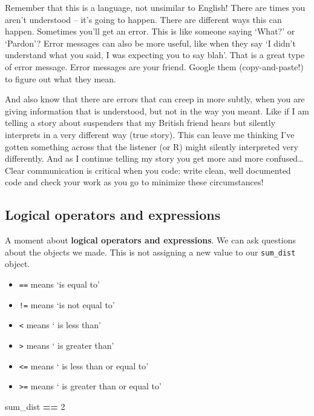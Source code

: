 \documentclass[]{book}
\newenvironment{Shaded}{\begin{snugshade}}{\end{snugshade}}
\newcommand{\DecValTok}[1]{\textcolor[rgb]{0.00,0.00,0.81}{#1}}
\newcommand{\NormalTok}[1]{#1}
\newcommand{\OperatorTok}[1]{\textcolor[rgb]{0.81,0.36,0.00}{\textbf{#1}}}
\newcommand{\StringTok}[1]{\textcolor[rgb]{0.31,0.60,0.02}{#1}}
\providecommand{\tightlist}{%
  \setlength{\itemsep}{0pt}\setlength{\parskip}{0pt}}
\begin{document}
Remember that this is a language, not unsimilar to English! There are times you aren't understood -- it's going to happen. There are different ways this can happen. Sometimes you'll get an error. This is like someone saying `What?' or `Pardon'? Error messages can also be more useful, like when they say `I didn't understand what you said, I was expecting you to say blah'. That is a great type of error message. Error messages are your friend. Google them (copy-and-paste!) to figure out what they mean.

And also know that there are errors that can creep in more subtly, when you are giving information that is understood, but not in the way you meant. Like if I am telling a story about suspenders that my British friend hears but silently interprets in a very different way (true story). This can leave me thinking I've gotten something across that the listener (or R) might silently interpreted very differently. And as I continue telling my story you get more and more confused\ldots{} Clear communication is critical when you code: write clean, well documented code and check your work as you go to minimize these circumstances!

\hypertarget{logical-operators-and-expressions}{%
\subsection{Logical operators and expressions}\label{logical-operators-and-expressions}}

A moment about \textbf{logical operators and expressions}. We can ask questions about the objects we made. This is not assigning a new value to our \texttt{sum\_dist} object.

\begin{itemize}
\tightlist
\item
  \texttt{==} means `is equal to'
\item
  \texttt{!=} means `is not equal to'
\item
  \texttt{\textless{}} means ` is less than'
\item
  \texttt{\textgreater{}} means ` is greater than'
\item
  \texttt{\textless{}=} means ` is less than or equal to'
\item
  \texttt{\textgreater{}=} means ` is greater than or equal to'
\end{itemize}

\begin{Shaded}
\begin{Highlighting}[]
\NormalTok{sum_dist }\OperatorTok{==}\StringTok{ }\DecValTok{2}
\end{Highlighting}
\end{Shaded}
\end{document}
